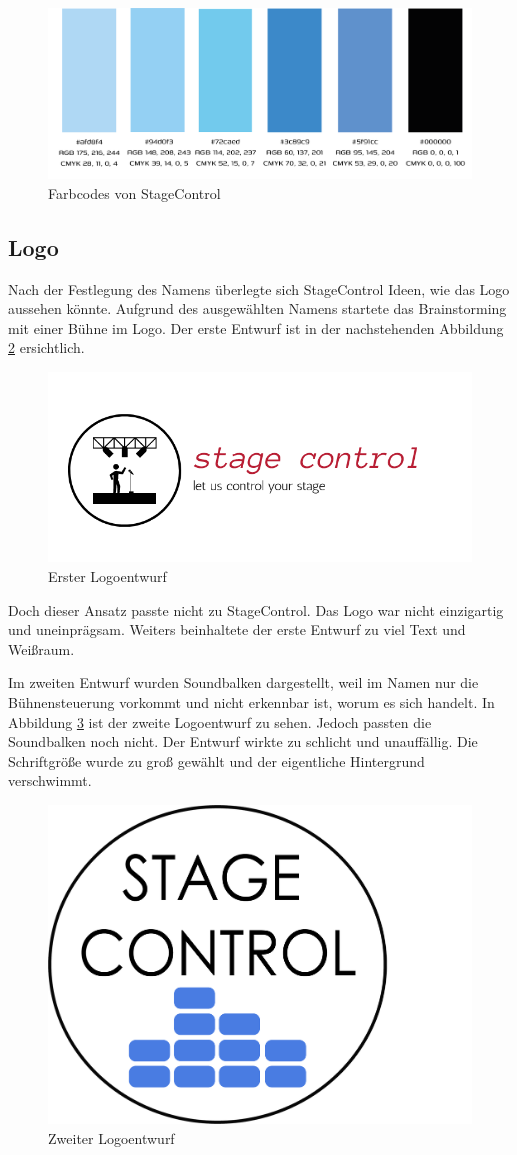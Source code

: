 \begin{figure}[H]
	\centering
	\includegraphics[width=0.7\linewidth]{images/Hexcode.png}
	\caption[Farbcodes von StageControl]{Farbcodes von StageControl}
	\label{fig:Hexcode}
\end{figure}


\subsection{Logo}
Nach der Festlegung des Namens überlegte sich StageControl Ideen, wie das Logo aussehen könnte. Aufgrund des ausgewählten Namens startete das Brainstorming mit einer Bühne im Logo. Der erste Entwurf ist in der nachstehenden Abbildung \ref{fig:Logoentwurf1} ersichtlich. 

\begin{figure}[H]
	\centering
	\includegraphics[width=0.5\linewidth]{images/Logoentwurf1.png}
	\caption[Erster Logoentwurf]{Erster Logoentwurf}
	\label{fig:Logoentwurf1}
\end{figure}

Doch dieser Ansatz passte nicht zu StageControl. Das Logo war nicht einzigartig und uneinprägsam. Weiters beinhaltete der erste Entwurf zu viel Text und Weißraum.

\newpage
Im zweiten Entwurf wurden Soundbalken dargestellt, weil im Namen nur die Bühnensteuerung vorkommt und nicht erkennbar ist, worum es sich handelt. In Abbildung \ref{fig:Logoentwurf2} ist der zweite Logoentwurf zu sehen. Jedoch passten die Soundbalken noch nicht. Der Entwurf wirkte zu schlicht und unauffällig. Die Schriftgröße wurde zu groß gewählt und der eigentliche Hintergrund verschwimmt.

\begin{figure}[H]
	\centering
	\includegraphics[width=0.5\linewidth]{images/Logoentwurf2.png}
	\caption[Zweiter Logoentwurf]{Zweiter Logoentwurf}
	\label{fig:Logoentwurf2}
\end{figure}

